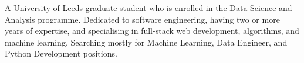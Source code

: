 

\begin{cvparagraph}

A University of Leeds graduate student who is enrolled in the Data Science and Analysis programme. Dedicated to software engineering, having two or more years of expertise, and specialising in full-stack web development, algorithms, and machine learning. Searching mostly for Machine Learning, Data Engineer, and Python Development positions.
\end{cvparagraph}
